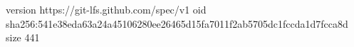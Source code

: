version https://git-lfs.github.com/spec/v1
oid sha256:541e38eda63a24a45106280ee26465d15fa7011f2ab5705dc1fccda1d7fcca8d
size 441
